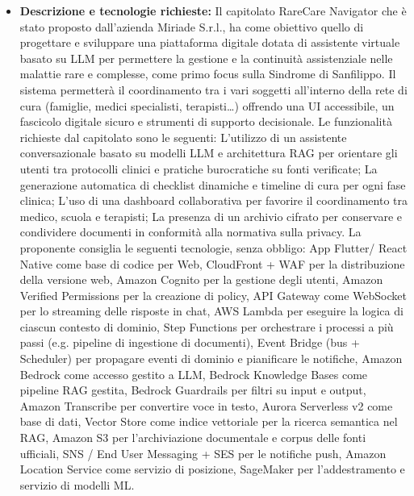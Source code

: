 \documentclass[12pt,a4paper]{article}
\newcommand{\tightlist}{\setlength{\itemsep}{1pt}\setlength{\parskip}{0pt}}
\begin{document}
\begin{itemize}
\tightlist
\item \textbf{Descrizione e tecnologie richieste:} Il capitolato RareCare Navigator che è stato proposto dall’azienda Miriade S.r.l., ha come obiettivo quello di progettare e sviluppare una piattaforma digitale dotata di assistente virtuale basato su LLM per permettere la gestione e la continuità assistenziale nelle malattie rare e complesse, come primo focus sulla Sindrome di Sanfilippo. 
Il sistema permetterà il coordinamento tra i vari soggetti all’interno della rete di cura (famiglie, medici specialisti, terapisti…) offrendo una UI accessibile, un fascicolo digitale sicuro e strumenti di supporto decisionale.
Le funzionalità richieste dal capitolato sono le seguenti:
L’utilizzo di un assistente conversazionale basato su modelli LLM e architettura RAG per orientare gli utenti tra protocolli clinici e pratiche burocratiche su fonti verificate;
La generazione automatica di checklist dinamiche e timeline di cura per ogni fase clinica;
L’uso di una dashboard collaborativa per favorire il coordinamento tra medico, scuola e terapisti;
La presenza di un archivio cifrato per conservare e condividere documenti in conformità alla normativa sulla privacy.
La proponente consiglia le seguenti tecnologie, senza obbligo:
App Flutter/ React Native come base di codice per Web, CloudFront + WAF per la distribuzione della versione web, Amazon Cognito per la gestione degli utenti, Amazon Verified Permissions per la creazione di policy, API Gateway come WebSocket per lo streaming delle risposte in chat,
AWS Lambda per eseguire la logica di ciascun contesto di dominio,
Step Functions per orchestrare i processi a più passi (e.g. pipeline di ingestione di documenti), Event Bridge (bus + Scheduler) per propagare eventi di dominio e pianificare le notifiche, Amazon Bedrock come accesso gestito a LLM, Bedrock Knowledge Bases come pipeline RAG gestita, Bedrock Guardrails per filtri su input e output, Amazon Transcribe per convertire voce in testo, Aurora Serverless v2 come base di dati, Vector Store come indice vettoriale per la ricerca semantica nel RAG, Amazon S3 per l’archiviazione documentale e corpus delle fonti ufficiali, SNS / End User Messaging + SES per le notifiche push, Amazon Location Service come servizio di posizione, SageMaker per l'addestramento e servizio di modelli ML.


\end{itemize}
\end{document}
